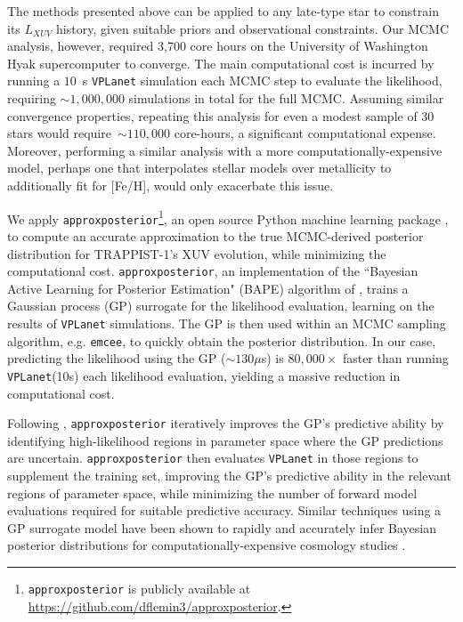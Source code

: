 \documentclass[twocolumn]{aastex62}
\newcommand{\vplanet}[0]{\texttt{VPLanet}\xspace}
\newcommand{\emcee}[0]{\texttt{emcee}\xspace}
\newcommand{\approxposterior}[0]{\texttt{approxposterior}\xspace}
\begin{document}
The methods presented above can be applied to any late-type star to constrain its $L_{XUV}$ history, given suitable priors and observational constraints. Our MCMC analysis, however, required 3,700 core hours on the University of Washington Hyak supercomputer to converge. The main computational cost is incurred by running a $10$~s \vplanet simulation each MCMC step to evaluate the likelihood, requiring ${\sim}1,000,000$ simulations in total for the full MCMC. Assuming similar convergence properties, repeating this analysis for even a modest sample of 30 stars would require~${\sim} 110,000$ core-hours, a significant computational expense. Moreover, performing a similar analysis with a more computationally-expensive model, perhaps one that interpolates stellar models over metallicity to additionally fit for [Fe/H], would only exacerbate this issue.

We apply \approxposterior\footnote{\approxposterior is publicly available at \href{https://github.com/dflemin3/approxposterior}{https://github.com/dflemin3/approxposterior}.}, an open source Python machine learning package \citep{FlemingVanderPlas2018}, to compute an accurate approximation to the true MCMC-derived posterior distribution for TRAPPIST-1's XUV evolution, while minimizing the computational cost. \approxposterior, an implementation of the ``Bayesian Active Learning for Posterior Estimation" (BAPE) algorithm of \citet{Kandasamy2015}, trains a Gaussian process (GP) surrogate for the likelihood evaluation, learning on the results of \vplanet simulations. The GP is then used within an MCMC sampling algorithm, e.g. \emcee, to quickly obtain the posterior distribution. In our case, predicting the likelihood using the GP (${\sim} 130 \mu$s) is $80,000 \times$ faster than running \vplanet (10s) each likelihood evaluation, yielding a massive reduction in computational cost.

Following \citet{Kandasamy2015}, \approxposterior iteratively improves the GP's predictive ability by identifying high-likelihood regions in parameter space where the GP predictions are uncertain. \approxposterior then evaluates \vplanet in those regions to supplement the training set, improving the GP's predictive ability in the relevant regions of parameter space, while minimizing the number of forward model evaluations required for suitable predictive accuracy. Similar techniques using a GP surrogate model have been shown to rapidly and accurately infer Bayesian posterior distributions for computationally-expensive cosmology studies \citep[e.g.][]{Bird2019}.
\end{document}
